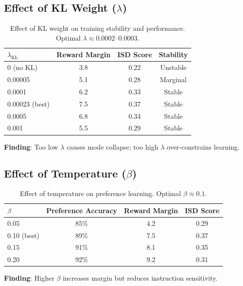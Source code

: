 \subsection{Effect of KL Weight ($\lambda$)}

\begin{table}[H]
\centering
\small
\begin{tabular}{@{}lccc@{}}
\toprule
\textbf{$\lambda_{\text{KL}}$} & \textbf{Reward Margin} & \textbf{ISD Score} & \textbf{Stability} \\
\midrule
0 (no KL) & 3.8 & 0.22 & Unstable \\
\hline
0.00005 & 5.1 & 0.28 & Marginal \\
\hline
0.0001 & 6.2 & 0.33 & Stable \\
\hline
0.00023 (best) & 7.5 & 0.37 & Stable \\
\hline
0.0005 & 6.8 & 0.34 & Stable \\
\hline
0.001 & 5.5 & 0.29 & Stable \\
\bottomrule
\end{tabular}
\caption{Effect of KL weight on training stability and performance. Optimal $\lambda \approx 0.0002$--$0.0003$.}
\label{tab:kl_ablation}
\end{table}

\textbf{Finding}: Too low $\lambda$ causes mode collapse; too high $\lambda$ over-constrains learning.

\subsection{Effect of Temperature ($\beta$)}

\begin{table}[H]
\centering
\small
\begin{tabular}{@{}lccc@{}}
\toprule
\textbf{$\beta$} & \textbf{Preference Accuracy} & \textbf{Reward Margin} & \textbf{ISD Score} \\
\midrule
0.05 & 85\% & 4.2 & 0.29 \\
\hline
0.10 (best) & 89\% & 7.5 & 0.37 \\
\hline
0.15 & 91\% & 8.1 & 0.35 \\
\hline
0.20 & 92\% & 9.2 & 0.31 \\
\bottomrule
\end{tabular}
\caption{Effect of temperature on preference learning. Optimal $\beta \approx 0.1$.}
\label{tab:beta_ablation}
\end{table}

\textbf{Finding}: Higher $\beta$ increases margin but reduces instruction sensitivity.

